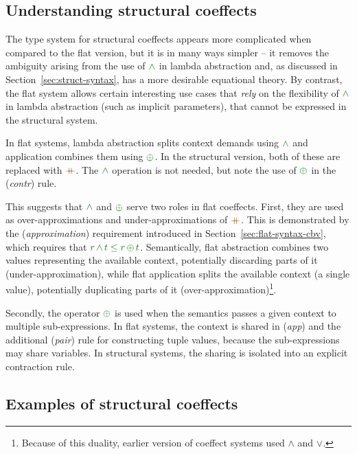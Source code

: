 \subsection{Understanding structural coeffects}

The type system for structural coeffects appears more complicated when compared to the flat
version, but it is in many ways simpler -- it removes the ambiguity arising from the use
of $\czip$ in lambda abstraction and, as discussed in Section~\ref{sec:struct-syntax}, has
a more desirable equational theory. By contrast, the flat system allows certain interesting
use cases that \emph{rely} on the flexibility of $\czip$ in lambda abstraction (such as implicit
parameters), that cannot be expressed in the structural system.

In flat systems, lambda abstraction splits context demands using $\czip$ and application
combines them using $\cpar$. In the structural version, both of these are replaced with $\atimes$.
The $\czip$ operation is not needed, but note the use of $\cpar$ in the (\emph{contr}) rule.

This suggests that $\czip$ and $\cpar$ serve two roles in flat coeffects. First, they are used
as over-approximations and under-approximations of $\atimes$. This is demonstrated by the
(\emph{approximation}) requirement introduced in Section~\ref{sec:flat-syntax-cbv}, which requires that
$\cclrd{r}\,\czip\,\cclrd{t}\;\cleq\;\cclrd{r}\,\cpar\,\cclrd{t}$. Semantically, flat abstraction
combines two values representing the available context, potentially discarding parts of it
(under-approximation), while flat application splits the available context (a single value),
potentially duplicating parts of it (over-approxi\-mation)\footnote{Because of this duality, earlier
version of coeffect systems \cite{coeffects-icalp13} used $\wedge$ and $\vee$.}.

Secondly, the operator $\cpar$ is used when the semantics passes a given context to multiple
sub-expressions. In flat systems, the context is shared in (\emph{app}) and the additional
(\emph{pair}) rule for constructing tuple values, because the sub-expressions may share variables.
In structural systems, the sharing is isolated into an explicit contraction rule.


\subsection{Examples of structural coeffects}

